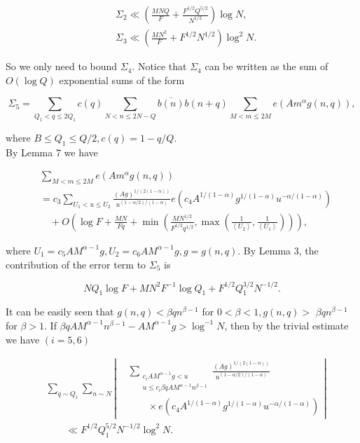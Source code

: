 \documentclass[10pt]{article}
\begin{document}
\begin{align*}
& \Sigma_{2} \ll\left(\frac{M N Q}{F}+\frac{F^{1 / 2} Q^{5 / 2}}{N^{1 / 2}}\right) \log N,  \tag{2.14}\\
& \Sigma_{3} \ll\left(\frac{M N^{2}}{F}+F^{1 / 2} N^{1 / 2}\right) \log ^{2} N . \tag{2.15}
\end{align*}


So we only need to bound $\Sigma_{4}$. Notice that $\Sigma_{4}$ can be written as the sum of $O(\log Q)$ exponential sums of the form


\begin{equation*}
\Sigma_{5}=\sum_{Q_{1}<q \leq 2 Q_{1}} c(q) \sum_{N<n \leq 2 N-Q} \overline{b(n)} b(n+q) \sum_{M<m \leq 2 M} e\left(A m^{\alpha} g(n, q)\right), \tag{2.16}
\end{equation*}


where $B \leq Q_{1} \leq Q / 2, c(q)=1-q / Q$.\\
By Lemma 7 we have


\begin{align*}
& \sum_{M<m \leq 2 M} e\left(A m^{\alpha} g(n, q)\right)  \tag{2.17}\\
& =c_{3} \sum_{U_{1}<u \leq U_{2}} \frac{(A g)^{1 /(2(1-\alpha))}}{u^{(1-\alpha / 2) /(1-\alpha)}} e\left(c_{4} A^{1 /(1-\alpha)} g^{1 /(1-\alpha)} u^{-\alpha /(1-\alpha)}\right) \\
& \quad+O\left(\log F+\frac{M N}{F q}+\min \left(\frac{M N^{1 / 2}}{F^{1 / 2} q^{1 / 2}}, \max \left(\frac{1}{\left\langle U_{2}\right\rangle}, \frac{1}{\left\langle U_{1}\right\rangle}\right)\right)\right),
\end{align*}


where $U_{1}=c_{5} A M^{\alpha-1} g, U_{2}=c_{6} A M^{\alpha-1} g, g=g(n, q)$. By Lemma 3, the contribution of the error term to $\Sigma_{5}$ is

$$
N Q_{1} \log F+M N^{2} F^{-1} \log Q_{1}+F^{1 / 2} Q_{1}^{3 / 2} N^{-1 / 2}.
$$

It can be easily seen that $g(n, q)<\beta q n^{\beta-1}$ for $0<\beta<1, g(n, q)>$ $\beta q n^{\beta-1}$ for $\beta>1$. If $\beta q A M^{\alpha-1} n^{\beta-1}-A M^{\alpha-1} g>\log ^{-1} N$, then by the trivial estimate we have $(i=5,6)$

\begin{equation*}
\begin{aligned}
&\sum_{q\sim Q_{1}}\sum_{n\sim N}
\left|
\begin{aligned}
&\sum_{\substack{c_{i}AM^{\alpha-1}g<u\\
                  u\leq c_{i}\beta qAM^{\alpha-1}n^{\beta-1}}}
\frac{(Ag)^{1/(2(1-\alpha))}}{u^{(1-\alpha/2)/(1-\alpha)}} \\
&\qquad\times e\left(c_{4}A^{1/(1-\alpha)}g^{1/(1-\alpha)}
                 u^{-\alpha/(1-\alpha)}\right)
\end{aligned}
\right| \\
&\qquad\ll F^{1/2}Q_{1}^{5/2}N^{-1/2}\log^{2}N.
\end{aligned}
\tag{2.18}
\end{equation*}
\end{document}
